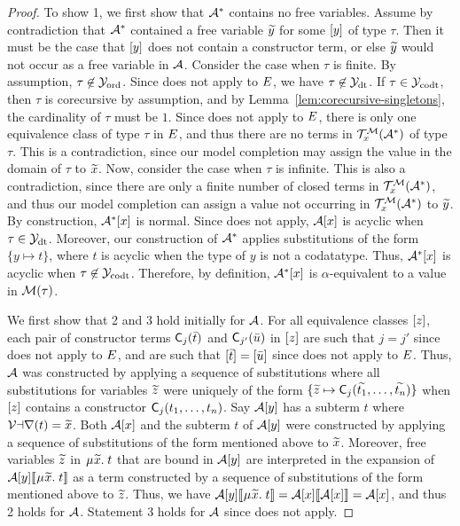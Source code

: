 \begin{proof}
To show 1, we first show that $\mathcal{A}^\ast$ contains no free variables.
Assume by contradiction that $\mathcal{A}^\ast$ contained a free variable ${\widetilde{y}}$ for some $[y]$ of type $\tau$.
Then it must be the case that $[y]$ does not contain a constructor term,
or else ${\widetilde{y}}$ would not occur as a free variable in $\mathcal{A}$.
Consider the case when $\tau$ is finite.
By assumption, $\tau \not\in \mathcal{Y}_{\mathrm{ord}}$.
Since  does not apply to $E$, we have $\tau \not\in \mathcal{Y}_{\mathrm{dt}}$.
If $\tau \in \mathcal{Y}_{\mathrm{codt}}$, then $\tau$ is corecursive by assumption, and by Lemma~\ref{lem:corecursive-singletons},
the cardinality of $\tau$ must be $1$.
Since  does not apply to $E$,
there is only one equivalence class of type $\tau$ in $E$,
and thus there are no terms in $\mathcal{T}^{\mathcal{M}}_x(\mathcal{A}^\ast)$ of type $\tau$.
This is a contradiction, since our model completion may assign the value in the domain of $\tau$ to ${\widetilde{x}}$.
Now, consider the case when $\tau$ is infinite.
This is also a contradiction,
since there are only a finite number of closed terms in $\mathcal{T}^{\mathcal{M}}_x(\mathcal{A}^\ast)$,
and thus our model completion can assign a value not occurring in $\mathcal{T}^{\mathcal{M}}_x(\mathcal{A}^\ast)$ to ${\widetilde{y}}$.
By construction, $\mathcal{A}^\ast [x]$ is normal.
Since  does not apply, $\mathcal{A} [x]$ is acyclic when $\tau \in \mathcal{Y}_{\mathrm{dt}}$.
Moreover, our construction of $\mathcal{A}^\ast$ applies substitutions of the form
$\{ y \mapsto t \}$, where $t$ is acyclic when the type of $y$ is not a codatatype.
Thus, $\mathcal{A}^\ast [x]$ is acyclic when $\tau \not\in \mathcal{Y}_{\mathrm{codt}}$.
Therefore, by definition, $\mathcal{A}^\ast [x]$ is $\alpha$-equivalent to a value in $\mathcal{M}( \tau )$.

We first show that 2 and 3 hold initially for $\mathcal{A}$.
For all equivalence classes $[z]$,
each pair of constructor terms $\textsf{C}_j( \bar t )$ and $\textsf{C}_{j'}( \bar u )$ in $[z]$
are such that $j = j'$ since  does not apply to $E$,
and are such that $[ \bar t ] = [ \bar u ]$ since  does not apply to $E$.
Thus, 
$\mathcal{A}$ was constructed by applying a sequence of substitutions
where all substitutions for variables ${\widetilde{z}}$ 
were uniquely of the form $\{ {\widetilde{z}} \mapsto \textsf{C}_j( {\widetilde{t_1}}, \ldots, {\widetilde{t_n}} ) \}$
when $[z]$ contains a constructor $\textsf{C}_j( t_1, \ldots, t_n )$.
Say $\mathcal{A} [y]$ has a subterm $t$ where $\mathcal{Var}(t) = {\widetilde{x}}$.
Both $\mathcal{A} [x]$ and the subterm $t$ of $\mathcal{A} [y]$ were
constructed by applying a sequence of substitutions of the form mentioned above to ${\widetilde{x}}$.
Moreover, free variables ${\widetilde{z}}$ in $\MU {\Varec{x}}.\; t$ that are bound in $\mathcal{A} [y]$ are interpreted in 
the expansion of $\Val \ec{y} \interp{ \MU {\Varec{x}}.\; t }$ as a term
constructed by a sequence of substitutions of the form mentioned above to ${\widetilde{z}}$. 
Thus, we have
$\Val \ec{y} \interp{ \MU {\Varec{x}}.\; t } = \Val \ec{x} \interp{ \Val \ec{x} } = \Val \ec{x}$, and thus 2 holds for $\mathcal{A}$.
Statement 3 holds for $\mathcal{A}$ since  does not apply.


\end{proof}

